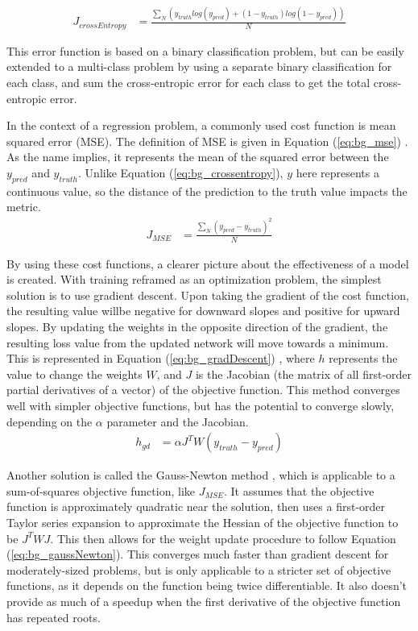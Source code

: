 	\begin{align}
		J_{crossEntropy} &= \frac{\sum_N (y_{truth}log(y_{pred}) + (1-y_{truth})log(1-y_{pred})) }{N} \label{eq:bg_crossentropy} 
	\end{align}
	\par This error function is based on a binary classification problem, but can be easily extended to a multi-class problem by using a separate binary classification for each class, and sum the cross-entropic error for each class to get the total cross-entropic error.  
	\par In the context of a regression problem, a commonly used cost function is mean squared error (MSE). The definition of MSE is given in Equation (\ref{eq:bg_mse}) \cite{lossFcns}. As the name implies, it represents the mean of the squared error between the $y_{pred}$ and $y_{truth}$. Unlike Equation (\ref{eq:bg_crossentropy}), $y$ here represents a continuous value, so the distance of the prediction to the truth value impacts the metric. 
	\begin{align}
		J_{MSE} &= \frac{\sum_N (y_{pred}-y_{truth})^2}{N} \label{eq:bg_mse}
	\end{align}
	\par By using these cost functions, a clearer picture about the effectiveness of a model is created. With training reframed as an optimization problem, the simplest solution is to use gradient descent. Upon taking the gradient of the cost function, the resulting value willbe negative for downward slopes and positive for upward slopes. By updating the weights in the opposite direction of the gradient, the resulting loss value from the updated network will move towards a minimum. This is represented in Equation (\ref{eq:bg_gradDescent}) \cite{backpropIntro}, where $h$ represents the value to change the weights $W$, and $J$ is the Jacobian (the matrix of all first-order partial derivatives of a vector) of the objective function. This method converges well with simpler objective functions, but has the potential to converge slowly, depending on the $\alpha$ parameter and the Jacobian.
	\begin{align}
		h_{gd} &= \alpha J^T W(y_{truth}-y_{pred}) \label{eq:bg_gradDescent}
	\end{align}
	\par Another solution is called the Gauss-Newton method \cite{gauss_newton_alg}, which is applicable to a sum-of-squares objective function, like $J_{MSE}$. It assumes that the objective function is approximately quadratic near the solution, then uses a first-order Taylor series expansion to approximate the Hessian of the objective function to be $J^TWJ$. This then allows for the weight update procedure to follow Equation (\ref{eq:bg_gaussNewton}). This converges much faster than gradient descent for moderately-sized problems, but is only applicable to a stricter set of objective functions, as it depends on the function being twice differentiable. It also doesn't provide as much of a speedup when the first derivative of the objective function has repeated roots. 
